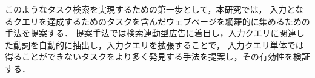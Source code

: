 \documentclass[submit,techreq]{ipsj}
\begin{document}
%
%
%
%



このようなタスク検索を実現するための第一歩として，本研究では，
入力となるクエリを達成するためのタスクを含んだウェブページを網羅的に集めるための手法を提案する．
提案手法では検索連動型広告に着目し，入力クエリに関連した動詞を自動的に抽出し，入力クエリを拡張することで，
入力クエリ単体では得ることができないタスクをより多く発見する手法を提案し，その有効性を検証する．
\end{document}
